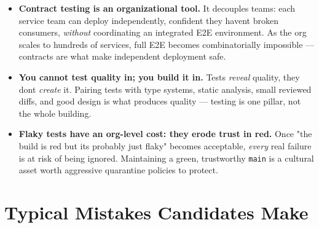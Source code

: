 \documentclass[11pt]{article}
\begin{document}
\begin{itemize}
\item
  \textbf{Contract testing is an organizational tool.} It decouples teams: each service team can deploy independently, confident they haven\textquotesingle t broken consumers, \emph{without} coordinating an integrated E2E environment. As the org scales to hundreds of services, full E2E becomes combinatorially impossible --- contracts are what make independent deployment safe.
\item
  \textbf{You cannot test quality in; you build it in.} Tests \emph{reveal} quality, they don\textquotesingle t \emph{create} it. Pairing tests with type systems, static analysis, small reviewed diffs, and good design is what produces quality --- testing is one pillar, not the whole building.
\item
  \textbf{Flaky tests have an org-level cost: they erode trust in red.} Once "the build is red but it\textquotesingle s probably just flaky" becomes acceptable, \emph{every} real failure is at risk of being ignored. Maintaining a green, trustworthy \texttt{main} is a cultural asset worth aggressive quarantine policies to protect.
\end{itemize}

\section{Typical Mistakes Candidates Make}\label{typical-mistakes-candidates-make}
\end{document}
